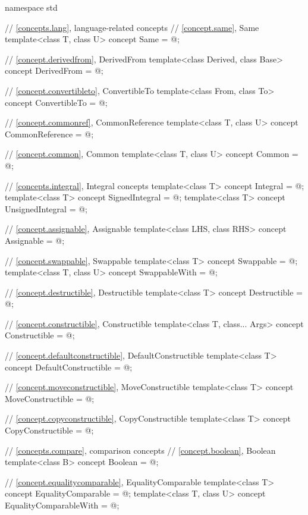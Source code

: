 %
\begin{codeblock}
namespace std {
  // \ref{concepts.lang}, language-related concepts
  // \ref{concept.same}, Same
  template<class T, class U>
    concept Same = @\seebelow@;

  // \ref{concept.derivedfrom}, DerivedFrom
  template<class Derived, class Base>
    concept DerivedFrom = @\seebelow@;

  // \ref{concept.convertibleto}, ConvertibleTo
  template<class From, class To>
    concept ConvertibleTo = @\seebelow@;

  // \ref{concept.commonref}, CommonReference
  template<class T, class U>
    concept CommonReference = @\seebelow@;

  // \ref{concept.common}, Common
  template<class T, class U>
    concept Common = @\seebelow@;

  // \ref{concepts.integral}, Integral concepts
  template<class T>
    concept Integral = @\seebelow@;
  template<class T>
    concept SignedIntegral = @\seebelow@;
  template<class T>
    concept UnsignedIntegral = @\seebelow@;

  // \ref{concept.assignable}, Assignable
  template<class LHS, class RHS>
    concept Assignable = @\seebelow@;

  // \ref{concept.swappable}, Swappable
  template<class T>
    concept Swappable = @\seebelow@;
  template<class T, class U>
    concept SwappableWith = @\seebelow@;

  // \ref{concept.destructible}, Destructible
  template<class T>
    concept Destructible = @\seebelow@;

  // \ref{concept.constructible}, Constructible
  template<class T, class... Args>
    concept Constructible = @\seebelow@;

  // \ref{concept.defaultconstructible}, DefaultConstructible
  template<class T>
    concept DefaultConstructible = @\seebelow@;

  // \ref{concept.moveconstructible}, MoveConstructible
  template<class T>
    concept MoveConstructible = @\seebelow@;

  // \ref{concept.copyconstructible}, CopyConstructible
  template<class T>
    concept CopyConstructible = @\seebelow@;

  // \ref{concepts.compare}, comparison concepts
  // \ref{concept.boolean}, Boolean
  template<class B>
    concept Boolean = @\seebelow@;

  // \ref{concept.equalitycomparable}, EqualityComparable
  template<class T>
    concept EqualityComparable = @\seebelow@;
  template<class T, class U>
    concept EqualityComparableWith = @\seebelow@;

}
\end{codeblock}
